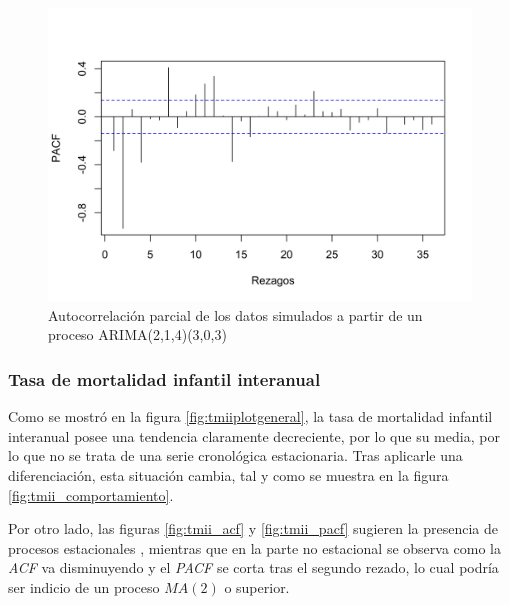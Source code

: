 \documentclass[
]{article}
\begin{document}
\begin{figure}[H]
\includegraphics[width=1\linewidth,height=1\textheight]{Tesis_files/figure-latex/arima214_303_pacf-1} \caption{Autocorrelación parcial de los datos simulados a partir de un proceso ARIMA(2,1,4)(3,0,3)}\label{fig:arima214_303_pacf}
\end{figure}

\subsubsection{Tasa de mortalidad infantil interanual}

Como se mostró en la figura \ref{fig:tmiiplotgeneral}, la tasa de
mortalidad infantil interanual posee una tendencia claramente
decreciente, por lo que su media, por lo que no se trata de una serie
cronológica estacionaria. Tras aplicarle una diferenciación, esta
situación cambia, tal y como se muestra en la figura
\ref{fig:tmii_comportamiento}.

Por otro lado, las figuras \ref{fig:tmii_acf} y \ref{fig:tmii_pacf}
sugieren la presencia de procesos estacionales , mientras que en la
parte no estacional se observa como la \emph{ACF} va disminuyendo y el
\emph{PACF} se corta tras el segundo rezado, lo cual podría ser indicio
de un proceso \(MA(2)\) o superior.
\end{document}
